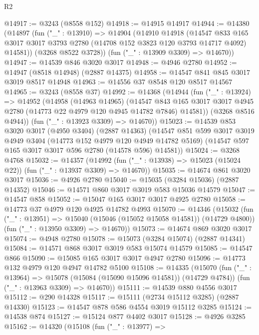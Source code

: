 \begin{lexlean}{R2}
\begin{coremodule}
@14917 := @3243 (@8558 @152)
@14918 := @14915 @14917
@14944 := @14380
    (@14897
      (fun ("_" : @13910) =>
      @14904
        (@14910
          @14918
          (@14547
            @833
            @165
            @3017
            @3017
            @3793
            @2780
            (@14708 @152 @3823 @120 @3793 @14717 @4092)
            @14581))
        (@3268 @8522 @3728))
      (fun ("_" : @13909 @3309) => @14670))
@14947 := @14539 @846 @3020 @3017
@14948 := @4946 @2780
@14952 := @14947 (@8518 @14948) (@2887 @14375)
@14958 := @14547 @841 @845 @3017 @3019 @8517 @14948
@14963 := @14556 @37 @8548 @120 @8517 @14567
@14965 := @3243 (@8558 @37)
@14992 := @14368
    (@14944
      (fun ("_" : @13924) =>
      @14952
        (@14958
          (@14963 @14965)
          (@14547
            @843
            @165
            @3017
            @3017
            @4945
            @2780
            (@14773 @22 @4979 @120 @4945 @14782 @7846)
            @14581))
        (@3268 @8516 @4944))
      (fun ("_" : @13923 @3309) => @14670))
@15023 := @14539
    @853
    @3020
    @3017
    (@4950 @3404)
    (@2887 @14363)
    (@14547
      @851
      @599
      @3017
      @3019
      @4949
      @3404
      (@14773 @152 @4979 @120 @4949 @14782 @5169)
      (@14547 @597 @165 @3017 @3017 @596 @2780 (@14578 @596) @14581))
@15024 := @3268 @4768
@15032 := @14357
    (@14992 (fun ("_" : @13938) => @15023 (@15024 @22)) (fun ("_" : @13937 @3309) => @14670))
@15035 := @14674 @861 @3020 @3017
@15036 := @4926 @2780
@15040 := @15035 (@3284 @15036) (@2887 @14352)
@15046 := @14571 @860 @3017 @3019 @583 @15036 @14579
@15047 := @14547 @858
@15052 := @15047 @165 @3017 @3017 @4925 @2780
@15058 := @14773 @37 @4979 @120 @4925 @14782 @4993
@15070 := @14346
    (@15032
      (fun ("_" : @13951) => @15040 (@15046 (@15052 @15058 @14581)) (@14729 @4800))
      (fun ("_" : @13950 @3309) => @14670))
@15073 := @14674 @869 @3020 @3017
@15074 := @4948 @2780
@15078 := @15073 (@3284 @15074) (@2887 @14341)
@15084 := @14571 @868 @3017 @3019 @583 @15074 @14579
@15085 := @14547 @866
@15090 := @15085 @165 @3017 @3017 @4947 @2780
@15096 := @14773 @132 @4979 @120 @4947 @14782 @5100
@15108 := @14335
    (@15070
      (fun ("_" : @13964) => @15078 (@15084 (@15090 @15096 @14581)) (@14729 @4784))
      (fun ("_" : @13963 @3309) => @14670))
@15111 := @14539 @880 @4556 @3017
@15112 := @290 @14328
@15117 := @15111 (@2734 @15112 @3285) (@2887 @14330)
@15123 := @14547 @878 @586 @4554 @3019 @15112 @3285
@15124 := @14538 @874
@15127 := @15124 @877 @4402 @3017
@15128 := @4926 @3285
@15162 := @14320
    (@15108
      (fun ("_" : @13977) =>

\end{coremodule}
\end{lexlean}
